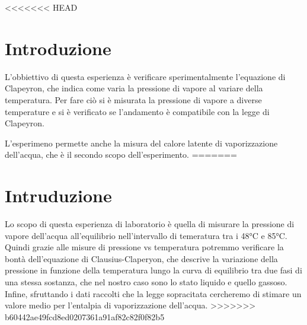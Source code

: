<<<<<<< HEAD
\section{Introduzione}

L'obbiettivo di questa esperienza è verificare sperimentalmente l'equazione di Clapeyron, che indica
come varia la pressione di vapore al variare della temperatura. Per fare ciò si è misurata la pressione di vapore
a diverse temperature e si è verificato se l'andamento è compatibile con la legge di Clapeyron.

L'esperimeno permette anche la misura del calore latente di vaporizzazione dell'acqua, che è il secondo
scopo dell'esperimento.
=======
\section{Intruduzione}

Lo scopo di questa esperienza di laboratorio è quella di misurare la pressione di vapore dell'acqua all'equilibrio nell'intervallo di temeratura tra i 48°C e 85°C. Quindi grazie alle misure di pressione vs temperatura potremmo verificare la bontà dell'equazione di Clausius-Claperyon, che descrive la variazione della pressione in funzione della temperatura lungo la curva di equilibrio tra due fasi di una stessa sostanza, che nel nostro caso sono lo stato liquido e quello gassoso.
Infine, sfruttando i dati raccolti che la legge sopracitata cercheremo di stimare un valore medio per l'entalpia di vaporizzazione dell'acqua.
>>>>>>> b60442ae49fcd8ed0207361a91af82c82f0f82b5
